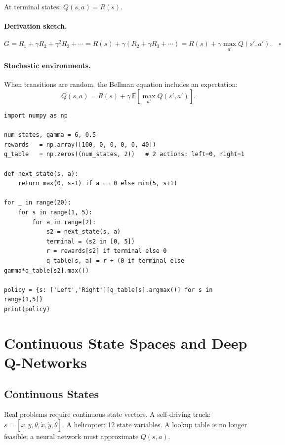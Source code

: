 At terminal states: $Q(s,a)=R(s)$.

\paragraph{Derivation sketch.}
\[G=R_1+\gamma R_2+\gamma^2 R_3+\cdots
=R(s)+\gamma(R_2+\gamma R_3+\cdots)
=R(s)+\gamma\max_{a'}Q(s',a').\quad\square\]

\paragraph{Stochastic environments.}
When transitions are random, the Bellman equation includes an expectation:
\begin{equation}
Q(s,a)=R(s)+\gamma\,\mathbb{E}[\max_{a'}Q(s',a')].
\label{eq:bellman-stoch}
\end{equation}

\begin{lstlisting}[caption={Tabular value iteration for the Mars Rover}]
import numpy as np

num_states, gamma = 6, 0.5
rewards   = np.array([100, 0, 0, 0, 0, 40])
q_table   = np.zeros((num_states, 2))   # 2 actions: left=0, right=1

def next_state(s, a):
    return max(0, s-1) if a == 0 else min(5, s+1)

for _ in range(20):
    for s in range(1, 5):
        for a in range(2):
            s2 = next_state(s, a)
            terminal = (s2 in [0, 5])
            r = rewards[s2] if terminal else 0
            q_table[s, a] = r + (0 if terminal else gamma*q_table[s2].max())

policy = {s: ['Left','Right'][q_table[s].argmax()] for s in range(1,5)}
print(policy)
\end{lstlisting}

\section{Continuous State Spaces and Deep Q-Networks}

\subsection{Continuous States}

Real problems require continuous state vectors. A self-driving truck:
$s=[x,y,\theta,\dot{x},\dot{y},\dot{\theta}]$. A helicopter: 12 state
variables. A lookup table is no longer feasible; a neural network must
approximate $Q(s,a)$.

